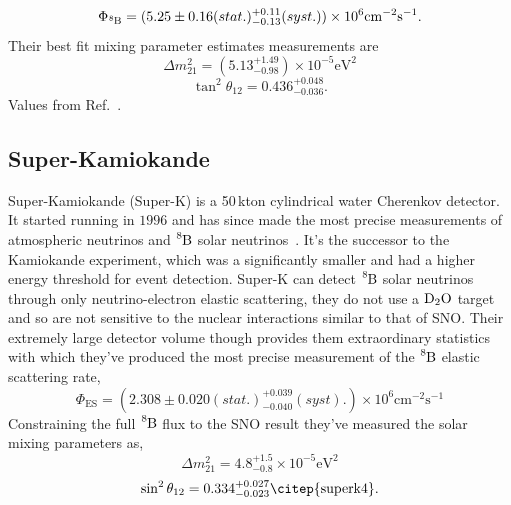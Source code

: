 \begin{equation*}
\Phi_{\ce{^{8}B}} = (5.25\pm0.16(stat.)^{+0.11}_{-0.13}(syst.))\times10^6\mathrm{cm}^{-2}\mathrm{s}^{-1}\text{.}
\end{equation*}
Their best fit mixing parameter estimates measurements are
\begin{equation}
\Delta m^{2}_{21}=(5.13^{+1.49}_{-0.98})\times10^{-5}\mathrm{eV}^2
\end{equation}
\begin{equation}
\tan^{2}\theta_{12} = 0.436^{+0.048}_{-0.036}\text{.}
\end{equation}
Values from Ref.~\citep{sno_combined}.

\subsection{Super-Kamiokande}
Super-Kamiokande (Super-K) is a 50\,kton cylindrical water Cherenkov detector.
It started running in $1996$ and has since made the most precise measurements of
atmospheric neutrinos and $\ce{^{8}B}$ solar neutrinos~\citep{superk4,superk4_atm}.
It's the successor to the Kamiokande experiment, which was a significantly
smaller and had a higher energy threshold for event detection.
Super-K can detect $\ce{^{8}B}$ solar neutrinos through only neutrino-electron elastic scattering,
they do not use a $\ce{D_{2}O}$ target and so are not sensitive to the
nuclear interactions similar to that of SNO\@.
Their extremely large detector volume though provides them extraordinary
statistics with which they've produced the most precise measurement of the $\ce{^{8}B}$
elastic scattering rate,
\begin{equation*}
\Phi_{\mathrm{ES}} = (2.308\pm0.020(stat.)^{+0.039}_{-0.040}(syst).)\times10^{6}\mathrm{cm}^{-2}\mathrm{s}^{-1}
\end{equation*}
Constraining the full $\ce{^{8}B}$ flux to the SNO result they've measured
the solar mixing parameters as,
\begin{equation*}
  \Delta m^{2}_{21} = 4.8^{+1.5}_{-0.8}\times10^{-5}\mathrm{eV}^{2}
\end{equation*}
\begin{equation*}
\sin^{2}\theta_{12} = 0.334^{+0.027}_{-0.023}\text{\citep{superk4}.}
\end{equation*}

